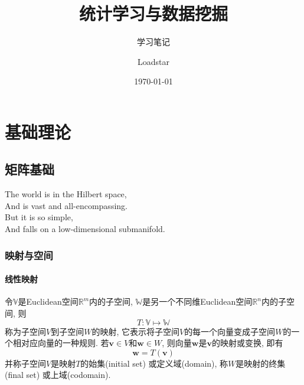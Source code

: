 \documentclass[lang=cn,10pt]{gorgeousnbook}
\title{统计学习与数据挖掘}
\subtitle{学习笔记}
\author{Loadstar}
\institute{Elegant\LaTeX{} Program}
\date{\today}
\numberwithin{equation}{section}%
\numberwithin{figure}{section}%
\begin{document}
\maketitle
%    
\frontmatter
\thispagestyle{fancy}
\tableofcontents

\mainmatter

\part{基础理论}

%
\chapter{矩阵基础}
\begin{center}
    The world is in the Hilbert space,\\
	And is vast and all-encompassing.\\
	But it is so simple,\\
	And falls on a low-dimensional submanifold.
\end{center}

\vspace{-5pt}
\begin{center}
\end{center}
\section{映射与空间}
\subsection{线性映射}
令$\mathbb{V}$是Euclidean空间$\mathbb{R}^m$内的子空间, $\mathbb{W}$是另一个不同维Euclidean空间$\mathbb{R}^n$内的子空间, 则
\begin{equation}
T: \mathbb{V}\mapsto \mathbb{W}
\end{equation}
称为子空间$V$到子空间$W$的映射, 它表示将子空间$V$的每一个向量变成子空间$W$的一个相对应向量的一种规则. 若$\boldsymbol{v}\in V$和$\boldsymbol{w}\in W$, 则向量$\boldsymbol{w}$是$\boldsymbol{v}$的映射或变换, 即有
\begin{equation}
\boldsymbol{w}=T\left(\boldsymbol{v}\right)
\end{equation}
并称子空间$V$是映射$T$的始集(initial set) 或定义域(domain), 称$W$是映射的终集(final set) 或上域(codomain).
\end{document}
